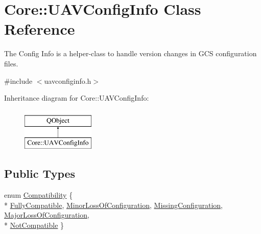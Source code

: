\hypertarget{class_core_1_1_u_a_v_config_info}{\section{Core\-:\-:U\-A\-V\-Config\-Info Class Reference}
\label{class_core_1_1_u_a_v_config_info}
}


The Config Info is a helper-\/class to handle version changes in G\-C\-S configuration files.  




{\ttfamily \#include $<$uavconfiginfo.\-h$>$}

Inheritance diagram for Core\-:\-:U\-A\-V\-Config\-Info\-:\begin{figure}[H]
\begin{center}
\leavevmode
\includegraphics[height=2.000000cm]{class_core_1_1_u_a_v_config_info}
\end{center}
\end{figure}
\subsection*{Public Types}
\begin{DoxyCompactItemize}
\item 
enum \hyperlink{group___core_plugin_ga568d6a6f7dd5f6d9b7ec976ff7c2284f}{Compatibility} \{ \\*
\hyperlink{group___core_plugin_gga568d6a6f7dd5f6d9b7ec976ff7c2284fa85ba54a790d9dbd1745c0a4ee00b78b2}{Fully\-Compatible}, 
\hyperlink{group___core_plugin_gga568d6a6f7dd5f6d9b7ec976ff7c2284faf84f7dc0a0a0fa25beb58f473f081ff8}{Minor\-Loss\-Of\-Configuration}, 
\hyperlink{group___core_plugin_gga568d6a6f7dd5f6d9b7ec976ff7c2284fa1a847c37ce622aaa288dcd65a29131de}{Missing\-Configuration}, 
\hyperlink{group___core_plugin_gga568d6a6f7dd5f6d9b7ec976ff7c2284fab2dcca46e2c0d231f1ab7250bfd3dca9}{Major\-Loss\-Of\-Configuration}, 
\\*
\hyperlink{group___core_plugin_gga568d6a6f7dd5f6d9b7ec976ff7c2284fa7174782f2d7d3709a890186f36e3480c}{Not\-Compatible}
 \}
\end{DoxyCompactItemize}
